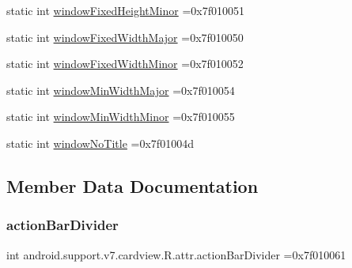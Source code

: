 \begin{DoxyCompactItemize}
\item 
static int \hyperlink{classandroid_1_1support_1_1v7_1_1cardview_1_1R_1_1attr_a60bf3e2e51947cdc537b53c40f25c529}{window\+Fixed\+Height\+Minor} =0x7f010051
\item 
static int \hyperlink{classandroid_1_1support_1_1v7_1_1cardview_1_1R_1_1attr_a6cdacbf4e2a2cbb70fdaf3d3a002e710}{window\+Fixed\+Width\+Major} =0x7f010050
\item 
static int \hyperlink{classandroid_1_1support_1_1v7_1_1cardview_1_1R_1_1attr_ad2c7c50efea2d85ec1c001bd5a98c508}{window\+Fixed\+Width\+Minor} =0x7f010052
\item 
static int \hyperlink{classandroid_1_1support_1_1v7_1_1cardview_1_1R_1_1attr_a2ecfc1a56d5e9664224bb3d917db75b6}{window\+Min\+Width\+Major} =0x7f010054
\item 
static int \hyperlink{classandroid_1_1support_1_1v7_1_1cardview_1_1R_1_1attr_a85ca0290c40bde370780acb11b48134e}{window\+Min\+Width\+Minor} =0x7f010055
\item 
static int \hyperlink{classandroid_1_1support_1_1v7_1_1cardview_1_1R_1_1attr_a874ce217d920846ce7cdff9d2841822b}{window\+No\+Title} =0x7f01004d
\end{DoxyCompactItemize}


\subsection{Member Data Documentation}
\mbox{\label{classandroid_1_1support_1_1v7_1_1cardview_1_1R_1_1attr_a46540c31785eb38b5f429ff0d328db89}} 
\subsubsection{\texorpdfstring{action\+Bar\+Divider}{actionBarDivider}}
{\footnotesize\ttfamily int android.\+support.\+v7.\+cardview.\+R.\+attr.\+action\+Bar\+Divider =0x7f010061\hspace{0.3cm}{\ttfamily [static]}}


